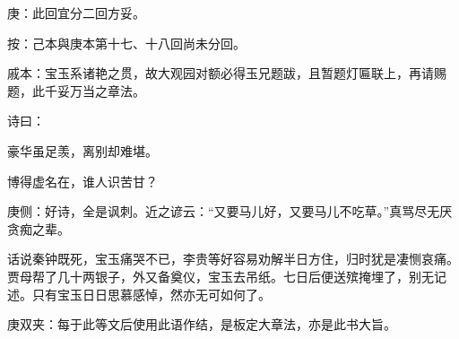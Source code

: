 
\begin{parag}
    \begin{note}庚：此回宜分二回方妥。\end{note}\begin{subnote}按：己本與庚本第十七、十八回尚未分回。\end{subnote}
\end{parag}


\begin{parag}
    \begin{note}戚本：宝玉系诸艳之贯，故大观园对额必得玉兄题跋，且暂题灯匾联上，再请赐题，此千妥万当之章法。\end{note}
\end{parag}


\begin{parag}
    诗曰：
\end{parag}

\begin{poem}
    \begin{pl}豪华虽足羡，离别却难堪。\end{pl}

    \begin{pl}博得虚名在，谁人识苦甘？\end{pl}
    \begin{note}庚侧：好诗，全是讽刺。近之谚云：“又要马儿好，又要马儿不吃草。”真骂尽无厌贪痴之辈。\end{note}
\end{poem}


\begin{parag}
    话说秦钟既死，宝玉痛哭不已，李贵等好容易劝解半日方住，归时犹是凄恻哀痛。贾母帮了几十两银子，外又备奠仪，宝玉去吊纸。七日后便送殡掩埋了，别无记述。只有宝玉日日思慕感悼，然亦无可如何了。\begin{note}庚双夹：每于此等文后使用此语作结，是板定大章法，亦是此书大旨。\end{note}
\end{parag}



